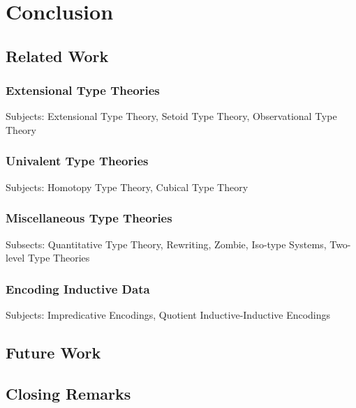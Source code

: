\chapter{Conclusion}


\section{Related Work}

\subsection{Extensional Type Theories}

Subjects: Extensional Type Theory, Setoid Type Theory, Observational Type Theory

\subsection{Univalent Type Theories}

Subjects: Homotopy Type Theory, Cubical Type Theory

\subsection{Miscellaneous Type Theories}

Subsects: Quantitative Type Theory, Rewriting, Zombie, Iso-type Systems, Two-level Type Theories

\subsection{Encoding Inductive Data}

Subjects: Impredicative Encodings, Quotient Inductive-Inductive Encodings


\section{Future Work}


\section{Closing Remarks}

